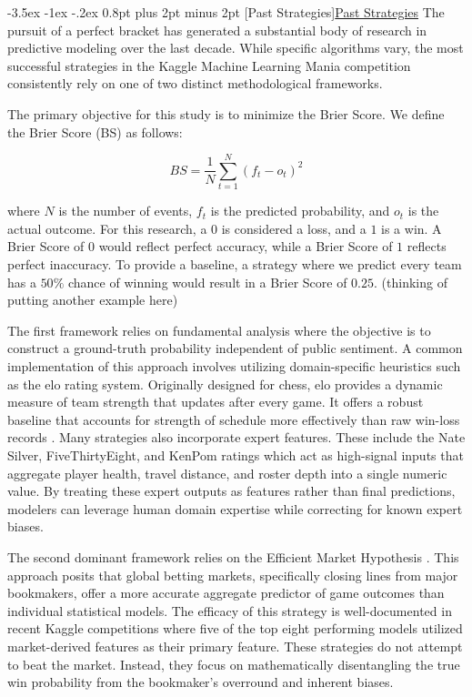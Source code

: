\documentclass[12pt,leqno]{article}\usepackage[pdftex]{graphicx}\usepackage[usenames,dvipsnames]{xcolor}
\makeatletter
\renewcommand\subsection{\@startsection {subsection}{1}{\z@}%
{-3.5ex \@plus -1ex \@minus -.2ex}%
{0.8pt plus 2pt minus 2pt}%
{\normalfont}}
\newcommand{\usubsection}[1]{\subsection[#1]{\centering\normalfont\underline{#1}}}%
\theoremstyle{remark}
\makeatother
\begin{document}
\usubsection{Past Strategies}
The pursuit of a perfect bracket has generated a substantial body of research in predictive modeling over the last decade. While specific algorithms vary, the most successful strategies in the Kaggle Machine Learning Mania competition consistently rely on one of two distinct methodological frameworks.

The primary objective for this study is to minimize the Brier Score. We define the Brier Score (BS) as follows:

\begin{equation}
    BS = \frac{1}{N} \sum_{t=1}^N (f_t - o_t)^2
\end{equation}

where $N$ is the number of events, $f_t$ is the predicted probability, and $o_t$ is the actual outcome. For this research, a $0$ is considered a loss, and a $1$ is a win. A Brier Score of $0$ would reflect perfect accuracy, while a Brier Score of $1$ reflects perfect inaccuracy. To provide a baseline, a strategy where we predict every team has a $50\%$ chance of winning would result in a Brier Score of $0.25$. (thinking of putting another example here)

The first framework relies on fundamental analysis where the objective is to construct a ground-truth probability independent of public sentiment. A common implementation of this approach involves utilizing domain-specific heuristics such as the elo rating system. Originally designed for chess, elo provides a dynamic measure of team strength that updates after every game. It offers a robust baseline that accounts for strength of schedule more effectively than raw win-loss records \cite{chess}. Many strategies also incorporate expert features. These include the Nate Silver, FiveThirtyEight, and KenPom ratings which act as high-signal inputs that aggregate player health, travel distance, and roster depth into a single numeric value. By treating these expert outputs as features rather than final predictions, modelers can leverage human domain expertise while correcting for known expert biases.

The second dominant framework relies on the Efficient Market Hypothesis \cite{EMH}. This approach posits that global betting markets, specifically closing lines from major bookmakers, offer a more accurate aggregate predictor of game outcomes than individual statistical models. The efficacy of this strategy is well-documented in recent Kaggle competitions where five of the top eight performing models utilized market-derived features as their primary feature. These strategies do not attempt to beat the market. Instead, they focus on mathematically disentangling the true win probability from the bookmaker's overround and inherent biases.
\end{document}
